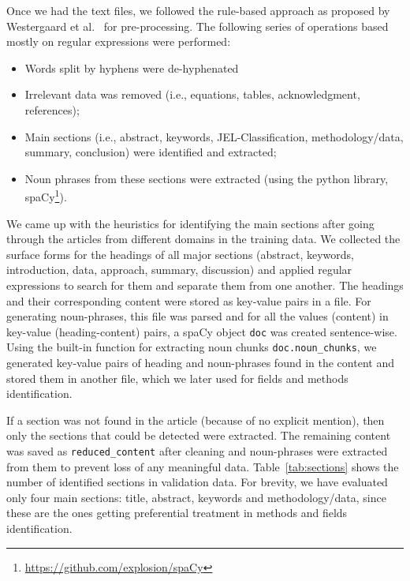 \documentclass[runningheads]{llncs}
\begin{document}
\smallskip

Once we had the text files, we followed the rule-based approach as proposed by Westergaard et al.~\cite{DBLP:journals/ploscb/WestergaardSTJB18} for pre-processing. The following series of operations based mostly on regular expressions were performed:
\begin{itemize}
    \item Words split by hyphens were de-hyphenated %
    \item Irrelevant data was removed (i.e., equations, tables, acknowledgment, references);
    \item \raggedright Main sections (i.e., abstract, keywords,
    JEL-Classification, methodology/data, summary, conclusion) were identified and extracted;
    \item Noun phrases from these sections were extracted (using the python library, spaCy\footnote{\url{https://github.com/explosion/spaCy}}).
\end{itemize}

We came up with the heuristics for identifying the main sections after going through the articles from different domains in the training data. We collected the surface forms for the headings of all major sections (abstract, keywords, introduction, data, approach, summary, discussion) and applied regular expressions to search for them and separate them from one another. The headings and their corresponding content were stored as key-value pairs in a file. %
For generating noun-phrases, this file was parsed and for all the values (content) in key-value (heading-content) pairs, a spaCy object \texttt{doc} was created sentence-wise. Using the built-in function for extracting noun chunks {\texttt{doc.noun\_chunks}}, we generated key-value pairs of heading and noun-phrases found in the content and stored them in another file, which we later used for fields and methods identification.

If a section was not found in the article (because of no explicit mention), then only the sections that could be detected were extracted. The remaining content was saved as \texttt{reduced\_content} after cleaning and noun-phrases were extracted from them to prevent loss of any meaningful data. Table~\ref{tab:sections} shows the number of identified sections in validation data. For brevity, we have evaluated only four main sections: title, abstract, keywords and methodology/data, since these are the ones getting preferential treatment in methods and fields identification.
\end{document}
